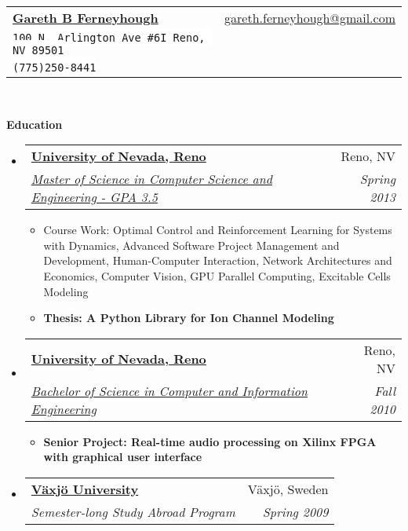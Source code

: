 \documentclass[letterpaper,11pt]{article}
\makeatletter
\newcommand{\resitem}[1]{\item #1 \vspace{-2pt}}
\newcommand{\resheading}[1]{{\large \colorbox{mygrey}{\begin{minipage}{\textwidth}{\textbf{#1 \vphantom{p\^{E}}}}\end{minipage}}}}
\newcommand{\ressubheading}[4]{
\begin{tabular*}{6.5in}{l@{\extracolsep{\fill}}r}
		\textbf{#1} & #2 \\
		\textit{#3} & \textit{#4} \\
\end{tabular*}\vspace{-6pt}}
\makeatother
\begin{document}
\newcommand{\mywebheader}{
\begin{tabular*}{7in}{l@{\extracolsep{\fill}}r}
	\textbf{\href{http://gferneyhough.com/}{\LARGE Gareth B Ferneyhough}} & \href{mailto:gareth.ferneyhough@gmail.com}{gareth.ferneyhough@gmail.com}\\
	{\footnotesize \texttt{\colorbox{white}{100 N. Arlington Ave \#6I Reno, NV 89501}}} &  \\
	{\footnotesize \texttt{\colorbox{white}{(775)250-8441}}}
	\end{tabular*}
\\
\vspace{0.1in}}

\mywebheader

\resheading{Education}
	\begin{itemize}
		\item
			\ressubheading{\href{http://www.unr.edu/}{University of Nevada, Reno}}{Reno, NV}{\href{http://www.cse.unr.edu/academics/graduate/cesms.html}{Master of Science in Computer Science and Engineering - GPA 3.5}}{Spring 2013}
				{ \footnotesize
				\begin{itemize}
				  \resitem{Course Work: Optimal Control and Reinforcement Learning for Systems with Dynamics, Advanced Software Project Management and Development, Human-Computer Interaction, Network Architectures and Economics, Computer Vision, GPU Parallel Computing, Excitable Cells Modeling}  
				  \resitem{\textbf{Thesis: A Python Library for Ion Channel Modeling}}
				\end{itemize}
				}
		\item
			\ressubheading{\href{http://www.unr.edu/}{University of Nevada, Reno}}{Reno, NV}{\href{http://www.cse.unr.edu/academics/undergraduate/ciebs.html}{Bachelor of Science in Computer and Information Engineering}}{Fall 2010}
				{ \footnotesize
				\begin{itemize}
				  \resitem{\textbf{Senior Project: Real-time audio processing on Xilinx FPGA with graphical user interface}}
				\end{itemize}
				}
		\item
			\ressubheading{\href{http://lnu.se/?l=en}{V\"{a}xj\"{o} University}}{V\"{a}xj\"{o}, Sweden}{Semester-long Study Abroad Program}{Spring 2009}
	\end{itemize} %
\end{document}
